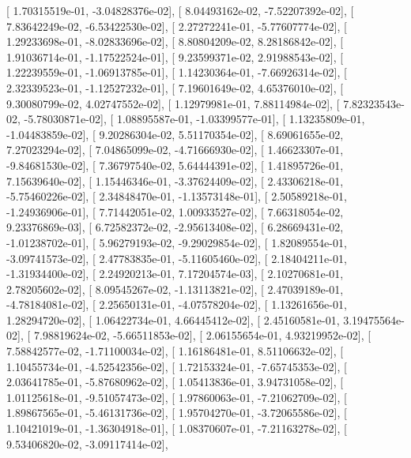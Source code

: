 \documentclass{article}
\begin{document}
       [  1.70315519e-01,  -3.04828376e-02],
       [  8.04493162e-02,  -7.52207392e-02],
       [  7.83642249e-02,  -6.53422530e-02],
       [  2.27272241e-01,  -5.77607774e-02],
       [  1.29233698e-01,  -8.02833696e-02],
       [  8.80804209e-02,   8.28186842e-02],
       [  1.91036714e-01,  -1.17522524e-01],
       [  9.23599371e-02,   2.91988543e-02],
       [  1.22239559e-01,  -1.06913785e-01],
       [  1.14230364e-01,  -7.66926314e-02],
       [  2.32339523e-01,  -1.12527232e-01],
       [  7.19601649e-02,   4.65376010e-02],
       [  9.30080799e-02,   4.02747552e-02],
       [  1.12979981e-01,   7.88114984e-02],
       [  7.82323543e-02,  -5.78030871e-02],
       [  1.08895587e-01,  -1.03399577e-01],
       [  1.13235809e-01,  -1.04483859e-02],
       [  9.20286304e-02,   5.51170354e-02],
       [  8.69061655e-02,   7.27023294e-02],
       [  7.04865099e-02,  -4.71666930e-02],
       [  1.46623307e-01,  -9.84681530e-02],
       [  7.36797540e-02,   5.64444391e-02],
       [  1.41895726e-01,   7.15639640e-02],
       [  1.15446346e-01,  -3.37624409e-02],
       [  2.43306218e-01,  -5.75460226e-02],
       [  2.34848470e-01,  -1.13573148e-01],
       [  2.50589218e-01,  -1.24936906e-01],
       [  7.71442051e-02,   1.00933527e-02],
       [  7.66318054e-02,   9.23376869e-03],
       [  6.72582372e-02,  -2.95613408e-02],
       [  6.28669431e-02,  -1.01238702e-01],
       [  5.96279193e-02,  -9.29029854e-02],
       [  1.82089554e-01,  -3.09741573e-02],
       [  2.47783835e-01,  -5.11605460e-02],
       [  2.18404211e-01,  -1.31934400e-02],
       [  2.24920213e-01,   7.17204574e-03],
       [  2.10270681e-01,   2.78205602e-02],
       [  8.09545267e-02,  -1.13113821e-02],
       [  2.47039189e-01,  -4.78184081e-02],
       [  2.25650131e-01,  -4.07578204e-02],
       [  1.13261656e-01,   1.28294720e-02],
       [  1.06422734e-01,   4.66445412e-02],
       [  2.45160581e-01,   3.19475564e-02],
       [  7.98819624e-02,  -5.66511853e-02],
       [  2.06155654e-01,   4.93219952e-02],
       [  7.58842577e-02,  -1.71100034e-02],
       [  1.16186481e-01,   8.51106632e-02],
       [  1.10455734e-01,  -4.52542356e-02],
       [  1.72153324e-01,  -7.65745353e-02],
       [  2.03641785e-01,  -5.87680962e-02],
       [  1.05413836e-01,   3.94731058e-02],
       [  1.01125618e-01,  -9.51057473e-02],
       [  1.97860063e-01,  -7.21062709e-02],
       [  1.89867565e-01,  -5.46131736e-02],
       [  1.95704270e-01,  -3.72065586e-02],
       [  1.10421019e-01,  -1.36304918e-01],
       [  1.08370607e-01,  -7.21163278e-02],
       [  9.53406820e-02,  -3.09117414e-02],
\end{document}
